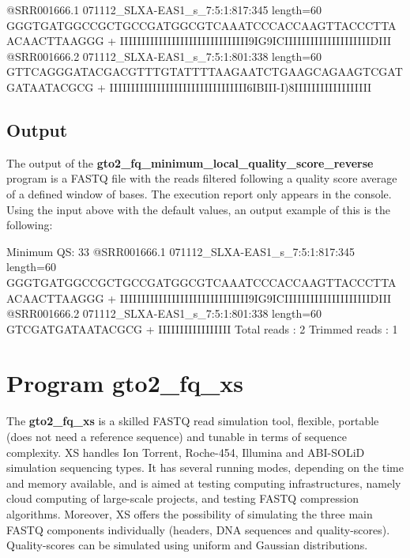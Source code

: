 \documentclass[11pt,]{krantz}
\newenvironment{Shaded}{\begin{snugshade}}{\end{snugshade}}
\newcommand{\ExtensionTok}[1]{#1}
\newcommand{\NormalTok}[1]{#1}
\begin{document}
\begin{Shaded}
\begin{Highlighting}[]
\ExtensionTok{@SRR001666.1}\NormalTok{ 071112_SLXA-EAS1_s_7:5:1:817:345 length=60}
\ExtensionTok{GGGTGATGGCCGCTGCCGATGGCGTCAAATCCCACCAAGTTACCCTTAACAACTTAAGGG}
\ExtensionTok{+}
\ExtensionTok{IIIIIIIIIIIIIIIIIIIIIIIIIIIIII9IG9ICIIIIIIIIIIIIIIIIIIIIDIII}
\ExtensionTok{@SRR001666.2}\NormalTok{ 071112_SLXA-EAS1_s_7:5:1:801:338 length=60}
\ExtensionTok{GTTCAGGGATACGACGTTTGTATTTTAAGAATCTGAAGCAGAAGTCGATGATAATACGCG}
\ExtensionTok{+}
\ExtensionTok{IIIIIIIIIIIIIIIIIIIIIIIIIIIIIIII6IBIII-I}\NormalTok{)}\ExtensionTok{8IIIIIIIIIIIIIIIIII}
\end{Highlighting}
\end{Shaded}

\subsection*{Output}\label{output-19}


The output of the
\textbf{gto2\_fq\_minimum\_local\_quality\_score\_reverse} program is a
FASTQ file with the reads filtered following a quality score average of
a defined window of bases. The execution report only appears in the
console. Using the input above with the default values, an output
example of this is the following:

\begin{Shaded}
\begin{Highlighting}[]
\ExtensionTok{Minimum}\NormalTok{ QS: 33}
\ExtensionTok{@SRR001666.1}\NormalTok{ 071112_SLXA-EAS1_s_7:5:1:817:345 length=60}
\ExtensionTok{GGGTGATGGCCGCTGCCGATGGCGTCAAATCCCACCAAGTTACCCTTAACAACTTAAGGG}
\ExtensionTok{+}
\ExtensionTok{IIIIIIIIIIIIIIIIIIIIIIIIIIIIII9IG9ICIIIIIIIIIIIIIIIIIIIIDIII}
\ExtensionTok{@SRR001666.2}\NormalTok{ 071112_SLXA-EAS1_s_7:5:1:801:338 length=60}
\ExtensionTok{GTCGATGATAATACGCG}
\ExtensionTok{+}
\ExtensionTok{IIIIIIIIIIIIIIIII}
\ExtensionTok{Total}\NormalTok{ reads    : 2}
\ExtensionTok{Trimmed}\NormalTok{ reads  : 1}
\end{Highlighting}
\end{Shaded}

\section{Program gto2\_fq\_xs}\label{program-gto2_fq_xs}

The \textbf{gto2\_fq\_xs} is a skilled FASTQ read simulation tool,
flexible, portable (does not need a reference sequence) and tunable in
terms of sequence complexity. XS handles Ion Torrent, Roche-454,
Illumina and ABI-SOLiD simulation sequencing types. It has several
running modes, depending on the time and memory available, and is aimed
at testing computing infrastructures, namely cloud computing of
large-scale projects, and testing FASTQ compression algorithms.
Moreover, XS offers the possibility of simulating the three main FASTQ
components individually (headers, DNA sequences and quality-scores).
Quality-scores can be simulated using uniform and Gaussian
distributions.
\end{document}

